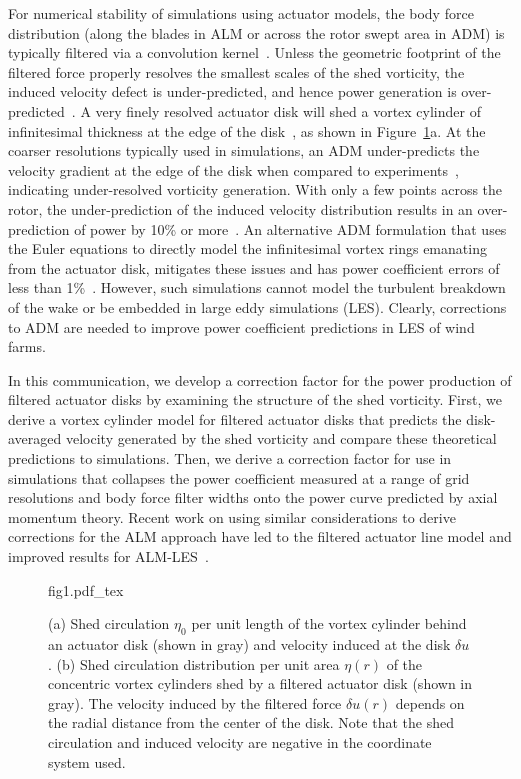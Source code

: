 \documentclass{article}
\begin{document}
For numerical stability of simulations using actuator models, the body force distribution (along the blades in ALM or across the rotor swept area in ADM) is typically filtered via a convolution kernel~\cite{Calaf2010a, Meyers2010a, Martinez2017b, Martinez2019a}. Unless the geometric footprint of the filtered force properly resolves the smallest scales of the shed vorticity, the induced velocity defect is under-predicted, and hence power generation is over-predicted~\cite{Martinez2017b, Martinez2019a}. A very finely resolved actuator disk will shed a vortex cylinder of infinitesimal thickness at the edge of the disk~\cite{Burton2011a}, as shown in Figure~\ref{fig:diagram}a. At the coarser resolutions typically used in simulations, an ADM under-predicts the velocity gradient at the edge of the disk when compared to experiments~\cite{Lignarolo2016a}, indicating under-resolved vorticity generation. With only a few points across the rotor, the under-prediction of the induced velocity distribution results in an over-prediction of power by 10\% or more~\cite{Munters2017a}. An alternative ADM formulation that uses the Euler equations to directly model the infinitesimal vortex rings emanating from the actuator disk, mitigates these issues and has power coefficient errors of less than 1\%~\cite{vanKuik2016a}. However, such simulations cannot model the turbulent breakdown of the wake or be embedded in large eddy simulations (LES). Clearly, corrections to ADM are needed to improve power coefficient predictions in LES of wind farms.

In this communication, we develop a correction factor for the power production of filtered actuator disks by examining the structure of the shed vorticity. First, we derive a vortex cylinder model for filtered actuator disks that predicts the disk-averaged velocity generated by the shed vorticity and compare these theoretical predictions to simulations. Then, we derive a correction factor for use in simulations that collapses the power coefficient measured at a range of grid resolutions and body force filter widths onto the power curve predicted by axial momentum theory. Recent work on using similar considerations to derive corrections for the ALM approach have led to the filtered actuator line model and improved results for ALM-LES~\cite{Martinez2017b, Martinez2019a}.

\begin{figure}
\begin{center}
{fig1.pdf_tex}
\caption{\label{fig:diagram} (a) Shed circulation $\eta_0$ per unit length of the vortex cylinder behind an actuator disk (shown in gray) and velocity induced at the disk $\delta u$. (b) Shed circulation distribution per unit area $\eta(r)$ of the concentric vortex cylinders shed by a filtered actuator disk (shown in gray). The velocity induced by the filtered force $\delta u(r)$ depends on the radial distance from the center of the disk. Note that the shed circulation and induced velocity are negative in the coordinate system used.}
\end{center}
\end{figure}
\end{document}
